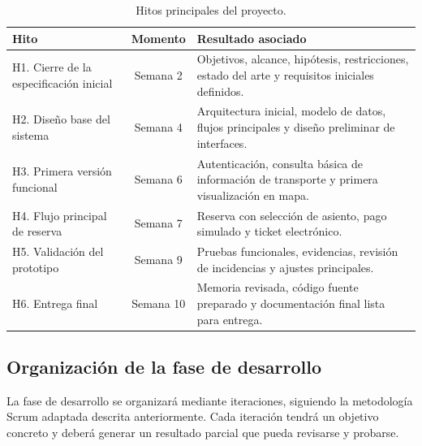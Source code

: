 \begin{table}[h!]
\centering
\small
\begin{tabular}{|p{5cm}|c|p{7cm}|}
\hline
\textbf{Hito} & \textbf{Momento} & \textbf{Resultado asociado} \\ \hline
H1. Cierre de la especificación inicial & Semana 2 & Objetivos, alcance, hipótesis, restricciones, estado del arte y requisitos iniciales definidos. \\ \hline
H2. Diseño base del sistema              & Semana 4 & Arquitectura inicial, modelo de datos, flujos principales y diseño preliminar de interfaces. \\ \hline
H3. Primera versión funcional            & Semana 6 & Autenticación, consulta básica de información de transporte y primera visualización en mapa. \\ \hline
H4. Flujo principal de reserva           & Semana 7 & Reserva con selección de asiento, pago simulado y ticket electrónico. \\ \hline
H5. Validación del prototipo             & Semana 9 & Pruebas funcionales, evidencias, revisión de incidencias y ajustes principales. \\ \hline
H6. Entrega final                        & Semana 10 & Memoria revisada, código fuente preparado y documentación final lista para entrega. \\ \hline
\end{tabular}
\caption{Hitos principales del proyecto.}
\label{tab:hitos}
\end{table}

\subsection{Organización de la fase de desarrollo}

La fase de desarrollo se organizará mediante iteraciones, siguiendo la metodología Scrum adaptada descrita anteriormente. Cada iteración tendrá un objetivo concreto y deberá generar un resultado parcial que pueda revisarse y probarse.


